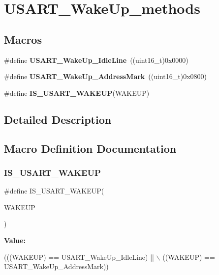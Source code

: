 \section{U\+S\+A\+R\+T\+\_\+\+Wake\+Up\+\_\+methods}
\label{group__USART__WakeUp__methods}
\subsection*{Macros}
\begin{DoxyCompactItemize}
\item 
\#define \textbf{ U\+S\+A\+R\+T\+\_\+\+Wake\+Up\+\_\+\+Idle\+Line}~((uint16\+\_\+t)0x0000)
\item 
\#define \textbf{ U\+S\+A\+R\+T\+\_\+\+Wake\+Up\+\_\+\+Address\+Mark}~((uint16\+\_\+t)0x0800)
\item 
\#define \textbf{ I\+S\+\_\+\+U\+S\+A\+R\+T\+\_\+\+W\+A\+K\+E\+UP}(W\+A\+K\+E\+UP)
\end{DoxyCompactItemize}


\subsection{Detailed Description}


\subsection{Macro Definition Documentation}
\mbox{\label{group__USART__WakeUp__methods_ga3611be417bdb82f42dc2ca17584271f9}} 
\subsubsection{I\+S\+\_\+\+U\+S\+A\+R\+T\+\_\+\+W\+A\+K\+E\+UP}
{\footnotesize\ttfamily \#define I\+S\+\_\+\+U\+S\+A\+R\+T\+\_\+\+W\+A\+K\+E\+UP(\begin{DoxyParamCaption}\item[{}]{W\+A\+K\+E\+UP }\end{DoxyParamCaption})}

{\bfseries Value\+:}
\begin{DoxyCode}
(((WAKEUP) == USART_WakeUp_IdleLine) || \(\backslash\)
                                 ((WAKEUP) == USART_WakeUp_AddressMark))
\end{DoxyCode}


